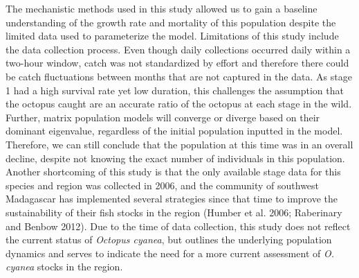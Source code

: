 \documentclass[
]{article}
\begin{document}
The mechanistic methods used in this study allowed us to gain a baseline understanding of the growth rate and mortality of this population despite the limited data used to parameterize the model. Limitations of this study include the data collection process. Even though daily collections occurred daily within a two-hour window, catch was not standardized by effort and therefore there could be catch fluctuations between months that are not captured in the data. As stage 1 had a high survival rate yet low duration, this challenges the assumption that the octopus caught are an accurate ratio of the octopus at each stage in the wild. Further, matrix population models will converge or diverge based on their dominant eigenvalue, regardless of the initial population inputted in the model. Therefore, we can still conclude that the population at this time was in an overall decline, despite not knowing the exact number of individuals in this population. Another shortcoming of this study is that the only available stage data for this species and region was collected in 2006, and the community of southwest Madagascar has implemented several strategies since that time to improve the sustainability of their fish stocks in the region (Humber et al. 2006; Raberinary and Benbow 2012). Due to the time of data collection, this study does not reflect the current status of \emph{Octopus cyanea}, but outlines the underlying population dynamics and serves to indicate the need for a more current assessment of \emph{O. cyanea} stocks in the region.
\end{document}
